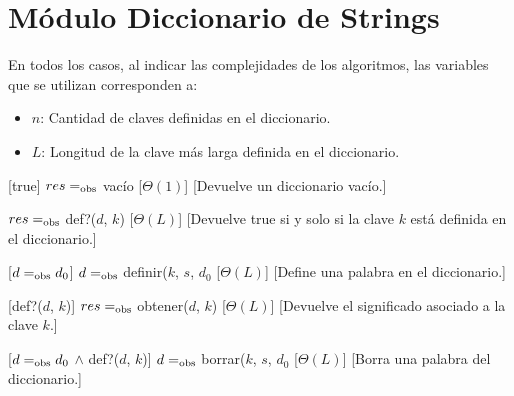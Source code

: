 \section{M\'{o}dulo Diccionario de Strings}

  En todos los casos, al indicar las complejidades de los algoritmos, las variables que se utilizan corresponden a:
  \vspace{-0.5em}\begin{itemize}
    \item $n$: Cantidad de claves definidas en el diccionario.
    \item $L$: Longitud de la clave m\'as larga definida en el diccionario.
  \end{itemize}

\begin{Interfaz}
  
  \begin{paramFormales}
    \paramGeneros{$\alpha$}

    

  \end{paramFormales}




    [true]
    {$res =_{\mathrm{obs}}$ vac\'{i}o}
    [$\Theta(1)$]
    [Devuelve un diccionario vac\'io.]

    {$res =_{\mathrm{obs}}$ def?($d$, $k$)}
    [$\Theta(L)$]
    [Devuelve true si y solo si la clave $k$ est\'a definida en el diccionario.]

    [$d =_{\mathrm{obs}} d_{0}$]
    {$d =_{\mathrm{obs}}$ definir($k$, $s$, $d_{0}$}
    [$\Theta(L)$]
    [Define una palabra en el diccionario.]

    [def?($d$, $k$)]
    {$res =_{\mathrm{obs}}$ obtener($d$, $k$)}
    [$\Theta(L)$]
    [Devuelve el significado asociado a la clave $k$.]

    [$d =_{\mathrm{obs}} d_{0}$ $\land$ def?($d$, $k$)]
    {$d =_{\mathrm{obs}}$ borrar($k$, $s$, $d_{0}$}
    [$\Theta(L)$]
    [Borra una palabra del diccionario.]

\end{Interfaz}
